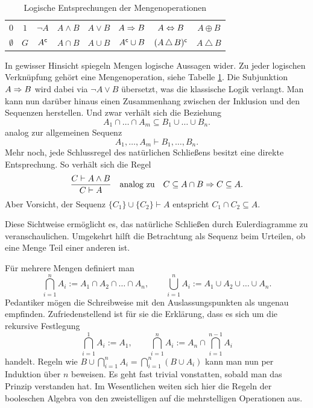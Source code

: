 \begin{table}
\begin{center}
\caption{Logische Entsprechungen der Mengenoperationen}
\label{tab:op-Logik-Mengen}
\begin{tabular}{c@{\quad\;\;}c@{\quad\;\;}c@{\quad\;\;}c@{\quad\;\;}%
c@{\quad\;\;}c@{\quad\;\;}c@{\quad\;\;}c}
\toprule
$0$ & $1$ & $\lnot A$ & $A\land B$ & $A\lor B$
& $A\Rightarrow B$ & $A\Leftrightarrow B$ & $A\oplus B$\\
$\emptyset$ & $G$ & $A^\mathsf c$ & $A\cap B$ & $A\cup B$
& $A^\mathsf c\cup B$ & $(A\,\triangle\,B)^\mathsf c$ & $A\:\triangle\:B$\\
\bottomrule
\end{tabular}
\end{center}
\end{table}

In gewisser Hinsicht spiegeln Mengen logische Aussagen wider.
Zu jeder logischen Verknüpfung gehört eine Mengenoperation, siehe
Tabelle \ref{tab:op-Logik-Mengen}. Die Subjunktion $A\Rightarrow B$
wird dabei via $\lnot A\lor B$ übersetzt, was die klassische Logik
verlangt. Man kann nun darüber hinaus einen
Zusammenhang zwischen der Inklusion und den Sequenzen
herstellen. Und zwar verhält sich die Beziehung
\[A_1\cap\ldots\cap A_m\subseteq B_1\cup\ldots\cup B_n.\]
analog zur allgemeinen Sequenz
\[A_1,\ldots,A_m\vdash B_1,\ldots,B_n.\]
Mehr noch, jede Schlussregel des natürlichen Schließens besitzt eine
direkte Entsprechung. So verhält sich die Regel
\[\frac{C\vdash A\land B}{C\vdash A}
\quad\text{analog zu}\quad C\subseteq A\cap B\Rightarrow C\subseteq A.\]
Aber Vorsicht, der Sequenz $\{C_1\}\cup\{C_2\}\vdash A$ entspricht
$C_1\cap C_2\subseteq A$.

Diese Sichtweise ermöglicht es, das natürliche Schließen durch
Eulerdiagramme zu veranschaulichen. Umgekehrt hilft die Betrachtung
als Sequenz beim Urteilen, ob eine Menge Teil einer anderen ist.

Für mehrere Mengen definiert man
\[\bigcap_{i=1}^n A_i := A_1\cap A_2\cap\ldots\cap A_n,\qquad
\bigcup_{i=1}^n A_i := A_1\cup A_2\cup\ldots\cup A_n.\]
Pedantiker mögen die Schreibweise mit den Auslassungspunkten als
ungenau empfinden. Zufriedenstellend ist für sie die Erklärung, dass
es sich um die rekursive Festlegung%
\[\bigcap_{i=1}^1 A_i := A_1,\qquad
\bigcap_{i=1}^n A_i := A_n\cap\bigcap_{i=1}^{n-1} A_i\]
handelt. Regeln wie $B\cup\bigcap_{i=1}^n A_i
= \bigcap_{i=1}^n (B\cup A_i)$ kann man nun per Induktion über $n$
beweisen. Es geht fast trivial vonstatten, sobald man das Prinzip
verstanden hat. Im Wesentlichen weiten sich hier die Regeln der
booleschen Algebra von den zweistelligen auf die mehrstelligen
Operationen aus.

